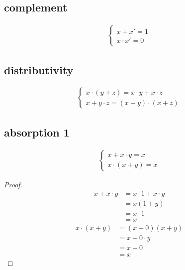 \documentclass[a4paper,12pt]{article}
\begin{document}
\subsection{complement}
\label{sec:org5274b1f}
\begin{lemma}
\begin{gather*}
  \begin{cases}
    x + x' = 1\\
    x \cdot x' = 0
  \end{cases}
\end{gather*}
\end{lemma}
\subsection{distributivity}
\label{sec:orgb7224e0}
\begin{lemma}
\begin{gather*}
  \begin{cases}
    x \cdot (y + z) = x \cdot y + x \cdot z\\
    x + y \cdot z = (x + y) \cdot (x + z)
  \end{cases}
\end{gather*}
\end{lemma}
\subsection{absorption 1}
\label{sec:org3cc7272}
\begin{lemma}
\begin{gather*}
  \begin{cases}
    x + x \cdot y = x\\
    x \cdot (x + y) = x
  \end{cases}
\end{gather*}
\begin{proof}
\begin{align*}
  x + x \cdot y &= x \cdot 1 + x \cdot y\\
                &= x(1 + y)\\
                &= x \cdot 1\\
                &= x
\end{align*}
\begin{align*}
  x \cdot (x + y) &= (x + 0)(x + y)\\
                  &= x + 0 \cdot y\\
                  &= x + 0\\
                  &= x
\end{align*}
\end{proof}
\end{lemma}
\end{document}
